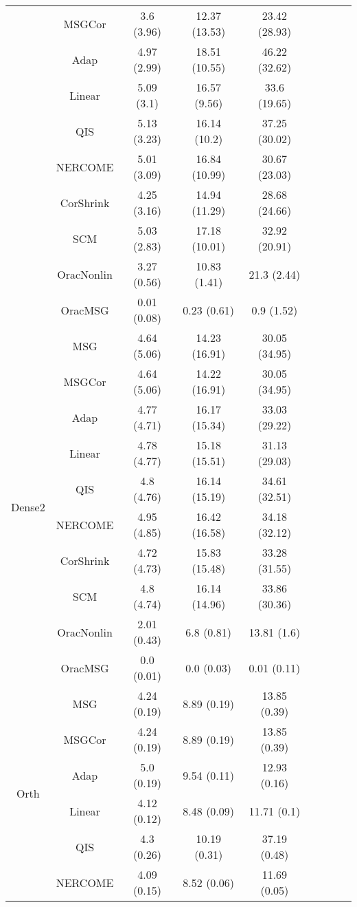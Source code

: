 \documentclass[useAMS,referee,usenatbib]{biom}
\begin{document}
\begin{table}[H]
{\begin{tabular}{ccccccccc}
 & MSGCor   & 3.6 (3.96)  & 12.37 (13.53) & 23.42 (28.93) \\
 & Adap     & 4.97 (2.99) & 18.51 (10.55) & 46.22 (32.62) \\
 & Linear         & 5.09 (3.1)  & 16.57 (9.56)  & 33.6 (19.65)  \\
 & QIS            & 5.13 (3.23) & 16.14 (10.2)  & 37.25 (30.02) \\
 & NERCOME        & 5.01 (3.09) & 16.84 (10.99) & 30.67 (23.03) \\
 & CorShrink      & 4.25 (3.16) & 14.94 (11.29) & 28.68 (24.66) \\
 & SCM            & 5.03 (2.83) & 17.18 (10.01) & 32.92 (20.91) \\
 & OracNonlin & 3.27 (0.56) & 10.83 (1.41)  & 21.3 (2.44)   \\
 & OracMSG  & 0.01 (0.08) & 0.23 (0.61)   & 0.9 (1.52)  \\  \midrule
\multirow{10}{*}{Dense2}    
 & MSG & 4.64 (5.06) & 14.23 (16.91) & 30.05 (34.95) \\
 & MSGCor   & 4.64 (5.06) & 14.22 (16.91) & 30.05 (34.95) \\
 & Adap     & 4.77 (4.71) & 16.17 (15.34) & 33.03 (29.22) \\
 & Linear         & 4.78 (4.77) & 15.18 (15.51) & 31.13 (29.03) \\
 & QIS            & 4.8 (4.76)  & 16.14 (15.19) & 34.61 (32.51) \\
 & NERCOME        & 4.95 (4.85) & 16.42 (16.58) & 34.18 (32.12) \\
 & CorShrink      & 4.72 (4.73) & 15.83 (15.48) & 33.28 (31.55) \\
 & SCM            & 4.8 (4.74)  & 16.14 (14.96) & 33.86 (30.36) \\
 & OracNonlin & 2.01 (0.43) & 6.8 (0.81)    & 13.81 (1.6)   \\
 & OracMSG  & 0.0 (0.01)  & 0.0 (0.03)    & 0.01 (0.11) \\ \midrule
\multirow{10}{*}{Orth}  
 & MSG & 4.24 (0.19) & 8.89 (0.19)  & 13.85 (0.39) \\
 & MSGCor   & 4.24 (0.19) & 8.89 (0.19)  & 13.85 (0.39) \\
 & Adap     & 5.0 (0.19)  & 9.54 (0.11)  & 12.93 (0.16) \\
 & Linear         & 4.12 (0.12) & 8.48 (0.09)  & 11.71 (0.1)  \\
 & QIS            & 4.3 (0.26)  & 10.19 (0.31) & 37.19 (0.48) \\
 & NERCOME        & 4.09 (0.15) & 8.52 (0.06)  & 11.69 (0.05) \\

\end{tabular}}
\end{table}
\end{document}
